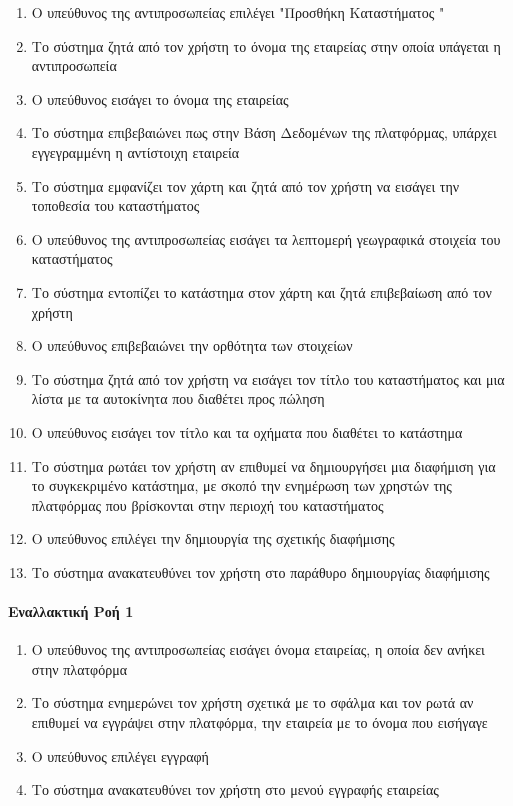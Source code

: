 \documentclass{../ol-softwaremanual}
\begin{document}
	\begin{enumerate}
		\item Ο υπεύθυνος της αντιπροσωπείας επιλέγει \en"\gr Προσθήκη Καταστήματος \en"\gr
		\item Το σύστημα ζητά από τον χρήστη το όνομα της εταιρείας στην οποία υπάγεται η αντιπροσωπεία
		\item Ο υπεύθυνος εισάγει το όνομα της εταιρείας
		\item Το σύστημα επιβεβαιώνει πως στην Βάση Δεδομένων της πλατφόρμας, υπάρχει εγγεγραμμένη η αντίστοιχη εταιρεία		
		\item Το σύστημα εμφανίζει τον χάρτη και ζητά από τον χρήστη να εισάγει την τοποθεσία του καταστήματος
		\item Ο υπεύθυνος της αντιπροσωπείας εισάγει τα λεπτομερή γεωγραφικά στοιχεία του καταστήματος
		\item Το σύστημα εντοπίζει το κατάστημα στον χάρτη και ζητά επιβεβαίωση από τον χρήστη
		\item Ο υπεύθυνος επιβεβαιώνει την ορθότητα των στοιχείων		
		\item Το σύστημα ζητά από τον χρήστη να εισάγει τον τίτλο του καταστήματος και μια λίστα με τα αυτοκίνητα που διαθέτει προς πώληση
		\item Ο υπεύθυνος εισάγει τον τίτλο και τα οχήματα που διαθέτει το κατάστημα
		\item Το σύστημα ρωτάει τον χρήστη αν επιθυμεί να δημιουργήσει μια διαφήμιση για το συγκεκριμένο κατάστημα, με σκοπό την ενημέρωση των χρηστών της πλατφόρμας που βρίσκονται στην περιοχή του καταστήματος
		\item Ο υπεύθυνος επιλέγει την δημιουργία της σχετικής διαφήμισης
		\item Το σύστημα ανακατευθύνει τον χρήστη στο παράθυρο δημιουργίας διαφήμισης			
	\end{enumerate}

	\paragraph{Εναλλακτική Ροή 1}
	
	\begin{enumerate}
		\item Ο υπεύθυνος της αντιπροσωπείας εισάγει όνομα εταιρείας, η οποία δεν ανήκει στην πλατφόρμα
		\item Το σύστημα ενημερώνει τον χρήστη σχετικά με το σφάλμα και τον ρωτά αν επιθυμεί να εγγράψει στην πλατφόρμα, την εταιρεία με το όνομα που εισήγαγε
		\item Ο υπεύθυνος επιλέγει εγγραφή 
		\item Το σύστημα ανακατευθύνει τον χρήστη στο μενού εγγραφής εταιρείας
	\end{enumerate}
\end{document}
